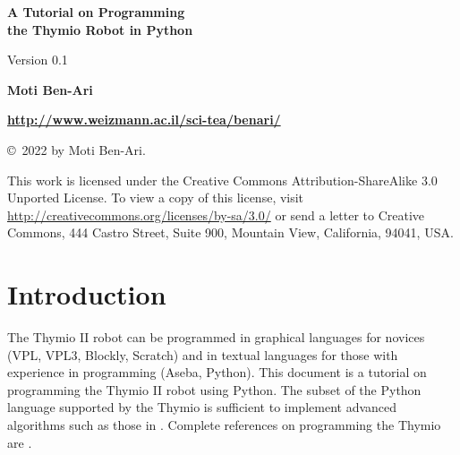 \documentclass[11pt,a4paper]{article}
\begin{document}
\thispagestyle{empty}

\begin{sffamily}
\begin{center}
\begin{LARGE}
\textbf{A Tutorial on Programming\\\bigskip
the Thymio Robot in Python}
\end{LARGE}

\bigskip

Version 0.1

\begin{Large}
\bigskip\bigskip\bigskip\bigskip
\textbf{Moti Ben-Ari}
\end{Large}

\bigskip\bigskip

\textbf{\url{http://www.weizmann.ac.il/sci-tea/benari/}}

\end{center}
\end{sffamily}

\vfill

\begin{center}
\copyright{}\  2022 by Moti Ben-Ari. 
\end{center}
\begin{small}
This work is licensed under the Creative Commons Attribution-ShareAlike 3.0 Unported License. To view a copy of this license, visit \url{http://creativecommons.org/licenses/by-sa/3.0/} or send a letter to Creative Commons, 444 Castro Street, Suite 900, Mountain View, California, 94041, USA.
\end{small}

\newpage
\setcounter{tocdepth}{2}
\tableofcontents

\thispagestyle{empty}
\newpage
\setcounter{page}{1}


\section{Introduction}\label{s.introduction}

The Thymio II robot can be programmed in graphical languages for novices (VPL, VPL3, Blockly, Scratch) and in textual languages for those with experience in programming (Aseba, Python). This document is a tutorial on programming the Thymio II robot using Python. The subset of the Python language supported by the Thymio is sufficient to implement advanced algorithms such as those in \cite{elements}. Complete references on programming the Thymio are \cite{native,thymio,tdm}.
\end{document}
